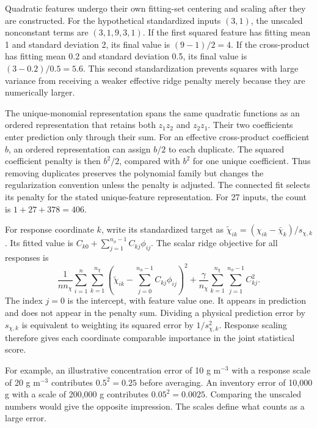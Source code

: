 Quadratic features undergo their own fitting-set centering and scaling after they are constructed. For the hypothetical standardized inputs $(3,1)$, the unscaled nonconstant terms are $(3,1,9,3,1)$. If the first squared feature has fitting mean 1 and standard deviation 2, its final value is $(9-1)/2=4$. If the cross-product has fitting mean 0.2 and standard deviation 0.5, its final value is $(3-0.2)/0.5=5.6$. This second standardization prevents squares with large variance from receiving a weaker effective ridge penalty merely because they are numerically larger.

The unique-monomial representation spans the same quadratic functions as an ordered representation that retains both $z_1z_2$ and $z_2z_1$. Their two coefficients enter prediction only through their sum. For an effective cross-product coefficient $b$, an ordered representation can assign $b/2$ to each duplicate. The squared coefficient penalty is then $b^2/2$, compared with $b^2$ for one unique coefficient. Thus removing duplicates preserves the polynomial family but changes the regularization convention unless the penalty is adjusted. The connected fit selects its penalty for the stated unique-feature representation. For 27 inputs, the count is $1+27+378=406$.

For response coordinate $k$, write its standardized target as $\widetilde\chi_{ik}=(\chi_{ik}-\bar\chi_k)/s_{\chi,k}$. Its fitted value is $C_{k0}+\sum_{j=1}^{n_\phi-1}C_{kj}\phi_{ij}$. The scalar ridge objective for all responses is
\begin{equation}
\frac1{n n_\chi}\sum_{i=1}^{n}\sum_{k=1}^{n_\chi}
\left(\widetilde\chi_{ik}-\sum_{j=0}^{n_\phi-1}C_{kj}\phi_{ij}\right)^2
+\frac{\gamma}{n_\chi}\sum_{k=1}^{n_\chi}\sum_{j=1}^{n_\phi-1}C_{kj}^2.
\end{equation}
The index $j=0$ is the intercept, with feature value one. It appears in prediction and does not appear in the penalty sum. Dividing a physical prediction error by $s_{\chi,k}$ is equivalent to weighting its squared error by $1/s_{\chi,k}^2$. Response scaling therefore gives each coordinate comparable importance in the joint statistical score.

For example, an illustrative concentration error of 10 g m$^{-3}$ with a response scale of 20 g m$^{-3}$ contributes $0.5^2=0.25$ before averaging. An inventory error of 10{,}000 g with a scale of 200{,}000 g contributes $0.05^2=0.0025$. Comparing the unscaled numbers would give the opposite impression. The scales define what counts as a large error.

